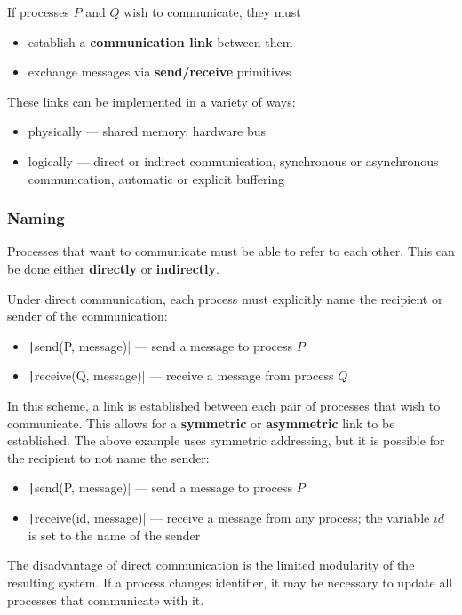 \documentclass{article}
\begin{document}
If processes \(P\) and \(Q\) wish to communicate, they must
\begin{itemize}
    \item establish a \textbf{communication link} between them
    \item exchange messages via \textbf{send/receive} primitives
\end{itemize}
These links can be implemented in a variety of ways:
\begin{itemize}
    \item physically --- shared memory, hardware bus
    \item logically --- direct or indirect communication, synchronous
          or asynchronous communication, automatic or explicit
          buffering
\end{itemize}
\subsubsection{Naming}
Processes that want to communicate must be able to refer to each other.
This can be done either \textbf{directly} or \textbf{indirectly}.

Under direct communication, each process must explicitly name the
recipient or sender of the communication:
\begin{itemize}
    \item \texttt|send(P, message)| --- send a message to
          process \(P\)
    \item \texttt|receive(Q, message)| --- receive a message
          from process \(Q\)
\end{itemize}
In this scheme, a link is established between each pair of processes
that wish to communicate. This allows for a \textbf{symmetric} or
\textbf{asymmetric} link to be established. The above example uses
symmetric addressing, but it is possible for the recipient to not
name the sender:
\begin{itemize}
    \item \texttt|send(P, message)| --- send a message to
          process \(P\)
    \item \texttt|receive(id, message)| --- receive a message
          from any process; the variable \(id\) is set to the name of
          the sender
\end{itemize}
The disadvantage of direct communication is the limited modularity of
the resulting system. If a process changes identifier, it may be
necessary to update all processes that communicate with it.
\end{document}
